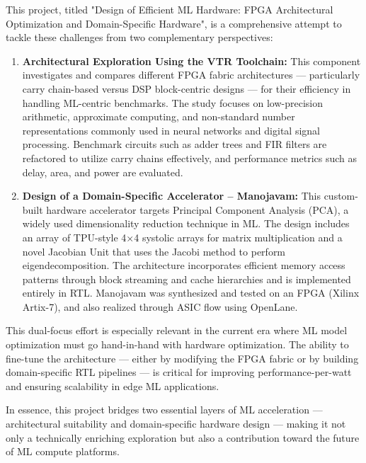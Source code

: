 This project, titled "Design of Efficient ML Hardware: FPGA Architectural Optimization and Domain-Specific Hardware", is a comprehensive attempt to tackle these challenges from two complementary perspectives:
\begin{enumerate}
	\item \textbf{Architectural Exploration Using the VTR Toolchain:} This component investigates and compares different FPGA fabric architectures — particularly carry chain-based versus DSP block-centric designs — for their efficiency in handling ML-centric benchmarks. The study focuses on low-precision arithmetic, approximate computing, and non-standard number representations commonly used in neural networks and digital signal processing. Benchmark circuits such as adder trees and FIR filters are refactored to utilize carry chains effectively, and performance metrics such as delay, area, and power are evaluated.
	\item \textbf{Design of a Domain-Specific Accelerator – Manojavam:} This custom-built hardware accelerator targets Principal Component Analysis (PCA), a widely used dimensionality reduction technique in ML. The design includes an array of TPU-style 4×4 systolic arrays for matrix multiplication and a novel Jacobian Unit that uses the Jacobi method to perform eigendecomposition. The architecture incorporates efficient memory access patterns through block streaming and cache hierarchies and is implemented entirely in RTL. Manojavam was synthesized and tested on an FPGA (Xilinx Artix-7), and also realized through ASIC flow using OpenLane.
\end{enumerate}

This dual-focus effort is especially relevant in the current era where ML model optimization must go hand-in-hand with hardware optimization. The ability to fine-tune the architecture — either by modifying the FPGA fabric or by building domain-specific RTL pipelines — is critical for improving performance-per-watt and ensuring scalability in edge ML applications.

In essence, this project bridges two essential layers of ML acceleration — architectural suitability and domain-specific hardware design — making it not only a technically enriching exploration but also a contribution toward the future of ML compute platforms.

